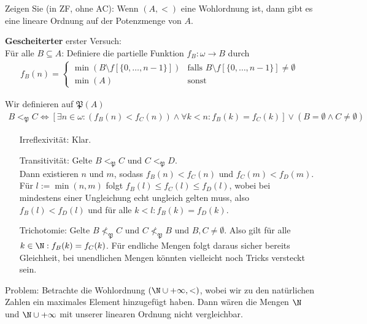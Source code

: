 
\begin{exercise}[287]

Zeigen Sie (in ZF, ohne AC): Wenn $(A,<)$ eine Wohlordnung ist, dann gibt es eine
lineare Ordnung auf der Potenzmenge von $A$.
\end{exercise}


\begin{solution}
\textbf{Gescheiterter} erster Versuch: \\
Für alle $B \subseteq A$: Definiere die partielle Funktion $f_B: \omega \to B$ durch
\begin{align*}
  f_B(n) = \begin{cases}
    \min(B \setminus f[\{0,\dots,n-1\}]) & \text{falls }
    B \setminus f[\{0,\dots,n-1\}] \neq \emptyset \\
    \min(A) & \text{sonst}
  \end{cases}
\end{align*}

Wir definieren auf $\mathfrak{P}(A)$
\begin{align*}
  B <_\mathfrak{P} C \iff [\exists n \in \omega: (f_B(n) < f_C(n)) \land \forall k < n: f_B(k) = f_C(k)] \lor (B = \emptyset \land C \neq \emptyset)
\end{align*}

\begin{itemize}
  \item[Irreflexivität:] Klar.
  \item[Transitivität:] Gelte $B <_\mathfrak{P} C$ und $C <_\mathfrak{P} D$. \\
  Dann existieren $n$ und $m$, sodass
  $f_B(n) < f_C(n)$ und $f_C(m) < f_D(m)$. Für $l := \min(n,m)$
  folgt $f_B(l) \leq f_C(l) \leq f_D(l)$, wobei bei mindestens einer Ungleichung
  echt ungleich gelten muss, also $f_B(l) < f_D(l)$ und für alle $k < l: f_B(k) = f_D(k)$.

  \item[Trichotomie:] Gelte $B \nless_\mathfrak{P} C$ und $C \nless_\mathfrak{P} B$
  und $B, C \neq \emptyset$. Also gilt für alle $k \in \N: f_B(k) = f_C(k)$.
  Für endliche Mengen folgt daraus sicher bereits Gleichheit, bei
  unendlichen Mengen könnten vielleicht noch Tricks versteckt sein. \\
\end{itemize}
Problem: Betrachte die Wohlordnung $(\N \cup +\infty, <)$, wobei wir zu den
natürlichen Zahlen ein maximales Element hinzugefügt haben. Dann wären die Mengen
$\N$ und $\N \cup +\infty$ mit unserer linearen Ordnung nicht vergleichbar.





\end{solution}
